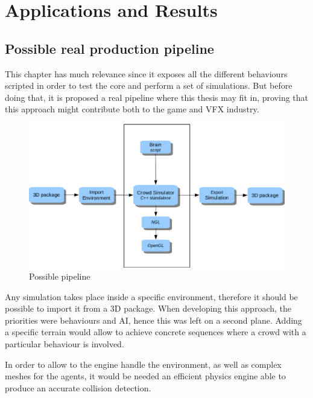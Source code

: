 \ifx\isEmbedded\undefined

\graphicspath{{../img/}}

\fi

\chapter{Applications and Results}
\label{chap:applications_and_results}

\section{Possible real production pipeline}

This chapter has much relevance since it exposes all the different behaviours scripted in order to test the core and perform a set of simulations. But before doing that, it is proposed a real pipeline where this thesis may fit in, proving that this approach might contribute both to the game and VFX industry.

\begin{figure}[!htb]
  \centering
  \includegraphics[scale=0.5]{pipeline.eps}
  \caption{Possible pipeline}
  \label{fig:classDiag}
\end{figure}

Any simulation takes place inside a specific environment, therefore it should be possible to import it from a 3D package. When developing this approach, the priorities were behaviours and AI, hence this was left on a second plane. Adding a specific terrain would allow to achieve concrete sequences where a crowd with a particular behaviour is involved.

In order to allow to the engine handle the environment, as well as complex meshes for the agents, it would be needed an efficient physics engine able to produce an accurate collision detection. 

